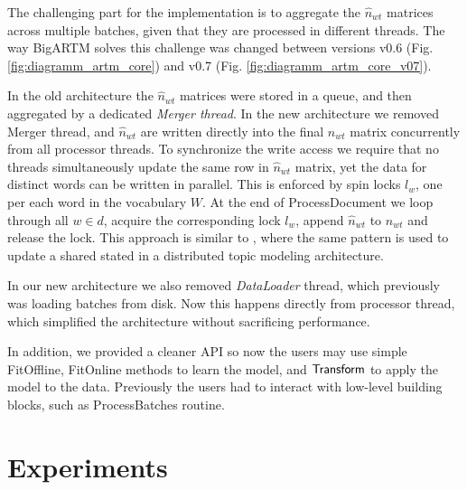 \documentclass[russian,english]{llncs}
\newcommand{\kw}[1]{\mbox{\textsf{#1}}}
\begin{document}
The challenging part for the implementation is to aggregate the $\hat n_{wt}$ matrices across multiple batches,
given that they are processed in different threads.
The way BigARTM solves this challenge was changed between versions \kw{v0.6} (Fig. \ref{fig:diagramm_artm_core})
and \kw{v0.7} (Fig. \ref{fig:diagramm_artm_core_v07}).

In the old architecture the $\hat n_{wt}$ matrices were stored in a queue,
and then aggregated by a dedicated \emph{Merger thread}.
In the new architecture we removed Merger thread,
and $\hat n_{wt}$ are written directly into the final $n_{wt}$ matrix
concurrently from all processor threads.
To synchronize the write access we require that
no threads simultaneously update the same row in $\hat n_{wt}$ matrix,
yet the data for distinct words can be written in parallel.
This is enforced by spin locks $l_w$, one per each word in the vocabulary $W$.
At the end of \kw{ProcessDocument} we loop through all $w \in d$, acquire the corresponding lock $l_w$, append $\hat n_{wt}$ to $n_{wt}$ and release the lock.
This approach is similar to \cite{smola10architecture},
where the same pattern is used to update a shared stated in a distributed topic modeling architecture.

In our new architecture we also removed \emph{DataLoader} thread, which previously was loading batches from disk.
Now this happens directly from processor thread, which simplified the architecture without sacrificing performance.

In addition, we provided a cleaner API so now the users may use simple \kw{FitOffline}, \kw{FitOnline} methods to learn the model,
and $\kw{Transform}$ to apply the model to the data.
Previously the users had to interact with low-level building blocks, such as \kw{ProcessBatches} routine.

\section{Experiments}
\label{sec:Experiments}
\end{document}
